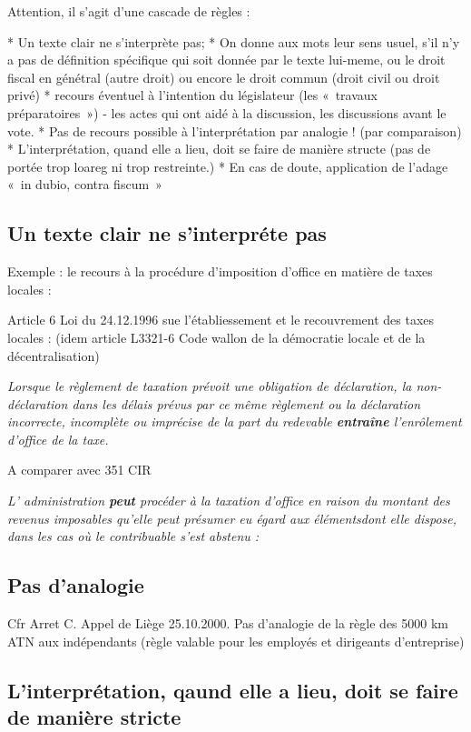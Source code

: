\documentclass{book}
\begin{document}
Attention, il s'agit d'une cascade de règles :

* Un texte clair ne s'interprète pas;
* On donne aux mots leur sens usuel, s'il n'y a pas de définition spécifique qui soit donnée par le texte lui-meme, ou le droit fiscal en génétral (autre droit) ou encore le droit commun (droit civil ou droit privé)
* recours éventuel à l'intention du législateur (les «~travaux préparatoires~») - les actes qui ont aidé à la discussion, les discussions avant le vote.
* Pas de recours possible à l'interprétation par analogie ! (par comparaison)
* L'interprétation, quand elle a lieu, doit se faire de manière structe (pas de portée trop loareg ni trop restreinte.)
* En cas de doute, application de l'adage «~in dubio, contra fiscum~»


\subsection{Un texte clair ne s'interpréte pas}

Exemple : le recours à la procédure d'imposition d'office en matière de taxes locales :

Article 6 Loi du 24.12.1996 sue l'établiessement et le recouvrement des taxes locales : (idem article L3321-6 Code wallon de la démocratie locale et de la décentralisation)

\textit{Lorsque le règlement de taxation prévoit une obligation de déclaration, la non-déclaration dans
les délais prévus par ce même règlement ou la déclaration incorrecte, incomplète ou imprécise de la part du
redevable \textbf{entraîne} l’enrôlement d’office de la taxe.}

A comparer avec 351 CIR

\textit{L' administration \textbf{peut} procéder à la taxation d'office en raison du montant des revenus imposables qu'elle peut présumer eu égard aux élémentsdont elle dispose, dans les cas où le contribuable s'est abstenu :}
   
   \subsection{Pas d'analogie}
   
   Cfr Arret C. Appel de Liège 25.10.2000. Pas d'analogie de la règle des 5000 km ATN aux indépendants (règle valable pour les employés et dirigeants d'entreprise)
   
      \subsection{L'interprétation, qaund elle a lieu, doit se faire de manière stricte}
\end{document}
